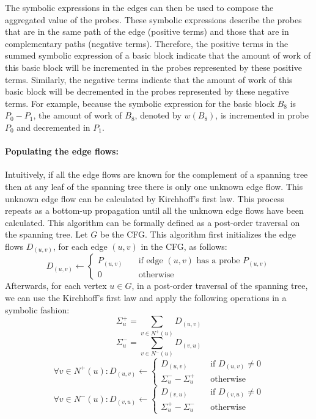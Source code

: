 The symbolic expressions in the edges can then be used to compose the aggregated
value of the probes.
These symbolic expressions describe the probes that are in the same path of the
edge (positive terms) and those that are in complementary paths (negative
terms).
Therefore, the positive terms in the summed symbolic expression of a
basic block indicate that the amount of work of this basic block will be
incremented in the probes represented by these positive terms.
Similarly, the negative terms indicate that the amount of work of this basic block
will be decremented in the probes represented by these negative terms.
For example, because the symbolic expression for the basic block $B_8$ is $P_0 - P_1$,
the amount of work of $B_8$, denoted by $w(B_8)$, is incremented in probe $P_0$
and decremented in $P_1$.

\paragraph{Populating the edge flows:}
Intuitively, if all the edge flows are known for the complement of a spanning tree
then at any leaf of the spanning tree there is only one unknown edge flow.
This unknown edge flow can be calculated by Kirchhoff's first law.
This process repeats as a bottom-up propagation until all the unknown edge flows
have been calculated.
This algorithm can be formally defined as a post-order traversal on the spanning
tree.
Let $G$ be the CFG.
This algorithm first initializes the edge flows $D_{(u,v)}$, for each edge
$(u,v)$ in the CFG, as follows:
\[
D_{(u,v)} \gets
\begin{cases}
    P_{(u,v)} & \quad \text{if edge $(u,v)$ has a probe $P_{(u,v)}$}\\
    0       & \quad \text{otherwise}
\end{cases}
\]
Afterwards, for each vertex $u\in G$, in a post-order traversal of the spanning tree,
we can use the Kirchhoff's first law and apply the following operations
in a symbolic fashion:
\[
\Sigma^+_u = \sum_{v\in N^+(u)} D_{(u,v)}
\]
\[
\Sigma^-_u = \sum_{v\in N^-(u)} D_{(v,u)}
\]
\[
\forall v\in N^+(u):  D_{(u,v)} \gets
\begin{cases}
    D_{(u,v)} & \quad \text{if $D_{(u,v)}\neq 0$}\\
    \Sigma^-_u - \Sigma^+_u       & \quad \text{otherwise}
\end{cases}
\]
\[
\forall v\in N^-(u):  D_{(v,u)} \gets
\begin{cases}
    D_{(v,u)} & \quad \text{if $D_{(v,u)}\neq 0$}\\
    \Sigma^+_u - \Sigma^-_u       & \quad \text{otherwise}
\end{cases}
\]

